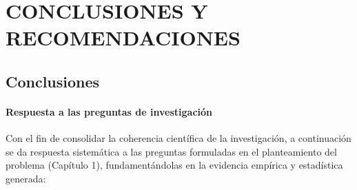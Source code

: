 \chapter{CONCLUSIONES Y RECOMENDACIONES}

\section{Conclusiones}

\subsubsection{Respuesta a las preguntas de investigación}

Con el fin de consolidar la coherencia científica de la investigación, a continuación se da respuesta sistemática a las preguntas formuladas en el planteamiento del problema (Capítulo 1), fundamentándolas en la evidencia empírica y estadística generada:

